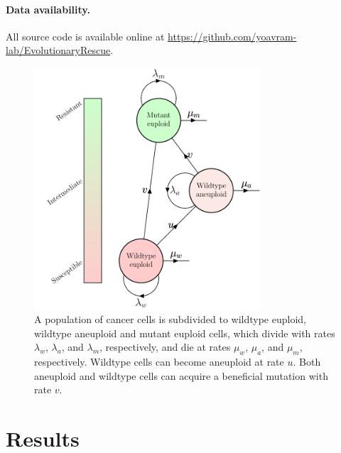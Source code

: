 \documentclass[12pt]{extarticle}
\begin{document}
\paragraph{Data availability.} All source code is available online at \url{https://github.com/yoavram-lab/EvolutionaryRescue}.



\begin{figure}
\centering
\includegraphics[width=0.75\textwidth]{Figures/figureAneuploidy.pdf}


\caption{
A population of cancer cells is subdivided to wildtype euploid, wildtype aneuploid and mutant euploid cells, which divide with rates $\lambda_w$, $\lambda_a$, and $\lambda_m$, respectively, and die at rates $\mu_w$, $\mu_a$, and $\mu_m$, respectively. 
Wildtype cells can become aneuploid at rate $u$. Both aneuploid and wildtype cells can acquire a beneficial mutation with rate $v$.}
\label{figureAneuploidy}
\end{figure}


\section*{Results}
\end{document}
